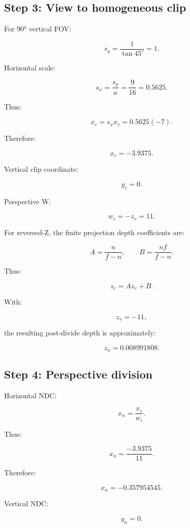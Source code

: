 \subsection{Step 3: View to homogeneous clip}\label{02-foundations-ii-ch037-step-3-view-to-homogeneous-clip}

\hypertarget{02-foundations-ii-ch037-step-3-view-to-homogeneous-clip}{}

For 90° vertical FOV:

\[ s_y=\frac1{\tan45^\circ}=1. \]

Horizontal scale:

\[ s_x=\frac{s_y}{a}=\frac9{16}=0.5625. \]

Thus:

\[ x_c=s_xx_v=0.5625(-7). \]

Therefore:

\[ \boxed{x_c=-3.9375}. \]

Vertical clip coordinate:

\[ \boxed{y_c=0}. \]

Perspective W:

\[ \boxed{w_c=-z_v=11}. \]

For reversed-Z, the finite projection depth coefficients are:

\[ A=\frac n{f-n}, \qquad B=\frac{nf}{f-n}. \]

Thus:

\[ z_c=Az_v+B. \]

With:

\[ z_v=-11, \]

the resulting post-divide depth is approximately:

\[ \boxed{z_n=0.008991808}. \]

\subsection{Step 4: Perspective division}\label{02-foundations-ii-ch037-step-4-perspective-division}

\hypertarget{02-foundations-ii-ch037-step-4-perspective-division}{}

Horizontal NDC:

\[ x_n=\frac{x_c}{w_c}. \]

Thus:

\[ x_n=\frac{-3.9375}{11}. \]

Therefore:

\[ \boxed{ x_n=-0.357954545. } \]

Vertical NDC:

\[ \boxed{y_n=0}. \]

